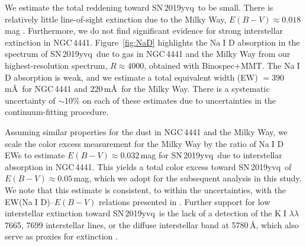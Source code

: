 \documentclass[twocolumn]{aastex63}
\def\ion#1#2{#1$\;${\footnotesize\rm{#2}}\relax}
\newcommand{\sn}{SN\,2019yvq}
\begin{document}
We estimate the total reddening toward \sn\ to be small. There is relatively
little line-of-sight extinction due to the Milky Way, $E(B-V) \approx
0.018$\,mag \citep{Schlegel98,Schlafly11}. Furthermore, we do not find
significant evidence for strong interstellar extinction in NGC\,4441.
Figure~\ref{fig:NaD} highlights the \ion{Na}{I} D absorption in the spectrum
of \sn\ due to gas in NGC\,4441 and the Milky Way from our highest-resolution
spectrum, $R \approx 4000$, obtained with Binospec+MMT. The \ion{Na}{I} D
absorption is weak, and we estimate a total equivalent width (EW) $=
390$\,m\AA\ for NGC\,4441 and $220$\,m\AA\ for the Milky Way. There is a
systematic uncertainty of $\sim$10\% on each of these estimates due to
uncertainties in the continuum-fitting procedure.

Assuming similar properties for the dust in NGC\,4441 and the Milky Way, we
scale the color excess measurement for the Milky Way by the ratio of
\ion{Na}{I} D EWs to estimate $E(B-V) \approx 0.032$\,mag for \sn\ due to
interstellar absorption in NGC\,4441. This yields a total color excess toward
\sn\ of $E(B-V) \approx 0.05$\,mag, which we adopt for the subsequent analysis
in this study. We note that this estimate is consistent, to within the
uncertainties, with the EW(\ion{Na}{I} D)--$E(B-V)$ relations presented in
\citet{Poznanski12}. Further support for low interstellar extinction toward
\sn\ is the lack of a detection of the \ion{K}{I} $\lambda\lambda$7665, 7699
interstellar lines, or the diffuse interstellar band at 5780\,\AA, which also
serve as proxies for extinction \citep{Phillips13}.
\end{document}
